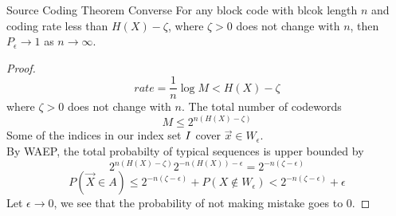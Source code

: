 \documentclass[../main.tex]{subfiles}
\begin{document}
\begin{bbox}{Source Coding Theorem Converse}
    For any block code with blcok length $n$ and coding rate less than $H(X)-\zeta$, where $\zeta>0$ does not change with $n$, then $P_\epsilon\to 1$ as $n\to \infty$.
    \begin{proof}
        \[
        rate = \frac{1}{n}\log M < H(X)-\zeta
        \] where $\zeta>0$ does not change with $n$. The total number of codewords \[
        M\leq 2^{n(H(X)-\zeta)}
        \]
        Some of the indices in our index set $I$ cover $\vec x \in W_{\epsilon}$.\\
        By WAEP, the total probabilty of typical sequences is upper bounded by \[
        2^{n(H(X)-\zeta)}2^{-n(H(X))-\epsilon} = 2^{-n(\zeta - \epsilon)}
        \]
        \[
        P(\vec X \in A) \leq 2^{-n(\zeta - \epsilon)} + P(X\notin W_\epsilon) < 2^{-n(\zeta - \epsilon)} + \epsilon
        \]
        Let $\epsilon\to 0$, we see that the probability of not making mistake goes to $0$.
    \end{proof}
\end{bbox}
\end{document}
